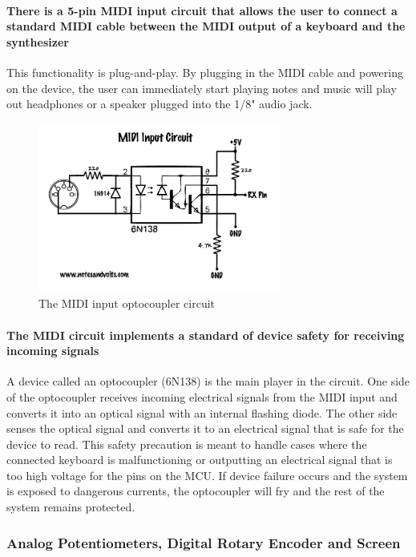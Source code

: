 \documentclass[acmlarge,screen]{acmart}
\begin{document}
	\paragraph{There is a 5-pin MIDI input circuit that allows the user to connect a standard MIDI cable between the MIDI output of a keyboard and the synthesizer} This functionality is plug-and-play. By plugging in the MIDI cable and powering on the device, the user can immediately start playing notes and music will play out headphones or a speaker  plugged into the 1/8" audio jack.
	
	\clearpage
	
	\begin{figure}
		\includegraphics[width=8cm]{midi_optocoupler_circuit}
		\caption{The MIDI input optocoupler circuit}
		\centering
	\end{figure}

	\paragraph{The MIDI circuit implements a standard of device safety for receiving incoming signals} A device called an optocoupler (6N138) is the main player in the circuit. One side of the optocoupler receives incoming electrical signals from the MIDI input and converts it into an optical signal with an internal flashing diode. The other side senses the optical signal and converts it to an electrical signal that is safe for the device to read. This safety precaution is meant to handle cases where the connected keyboard is malfunctioning or outputting an electrical signal that is too high voltage for the pins on the MCU. If device failure occurs and the system is exposed to dangerous currents, the optocoupler will fry and the rest of the system remains protected. \cite{notesandvolts}

	\subsubsection{Analog Potentiometers, Digital Rotary Encoder and Screen}
\end{document}
